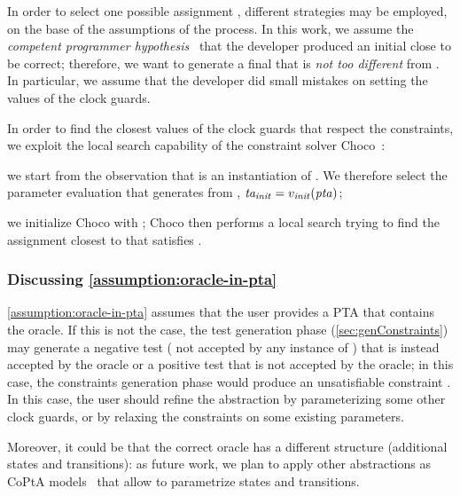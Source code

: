 \begin{tikzborder}{\cite{Gargantini16:validation}}
\begin{tikzborder}{\cite{gargantini_combinatorial_2017}}
\begin{tikzborder}{\cite{garn2019}}
\begin{tikzborder}{\cite{arcaini2019achieving}}
\begin{tikzborder}{\cite{arcaini2019varivolution}}
\begin{tikzborder}{}
In order to select one possible assignment \vRep, different strategies may be employed, on the base of the assumptions of the process. In this work, we assume the {\it competent programmer hypothesis}~\cite{surveyMutationTestingPapadakis2018} that the developer produced an initial \ta \initTa close to be correct; therefore, we want to generate a final \ta \repTa that is {\it not too different} from \initTa. In particular, we assume that the developer did small mistakes on setting the values of the clock guards.

In order to find the closest values of the clock guards that respect the constraints, we exploit the local search capability of the constraint solver Choco~\cite{choco}:
%
\begin{compactenum}
	\item we start from the observation that \initTa is an instantiation of \ptaProc. We therefore select the parameter evaluation \vInit that generates \initTa from \ptaProc, \ie{} $\mathit{ta_{init}} = v_{\mathit{init}}(\mathit{pta})$;
	\item we initialize Choco with \vInit; Choco then performs a local search trying to find the assignment closest to \vInit that satisfies \ptaConstr.
\end{compactenum}
\end{tikzborder}

\subsubsection{Discussing \ref{assumption:oracle-in-pta}}\label{ss:discussion-abstraction}

\begin{tikzborder}{}
\ref{assumption:oracle-in-pta} assumes that the user provides a PTA \ptaProc that contains the oracle.
If this is not the case, the test generation phase (\ref{sec:genConstraints}) may generate a negative test (\ie{} not accepted by any instance of \ptaProc) that is instead accepted by the oracle or a positive test that is not accepted by the oracle;
in this case, the constraints generation phase would produce an unsatisfiable constraint \ptaConstr. In this case, the user should refine the abstraction by parameterizing some other clock guards, or by relaxing the constraints on some existing parameters.

Moreover, it could be that the correct oracle has a different structure (additional states and transitions): as future work, we plan to apply other abstractions as CoPtA models~\cite{luthmann2019minimum} that allow to parametrize states and transitions.


\end{tikzborder}
\end{tikzborder}
\end{tikzborder}
\end{tikzborder}
\end{tikzborder}
\end{tikzborder}
